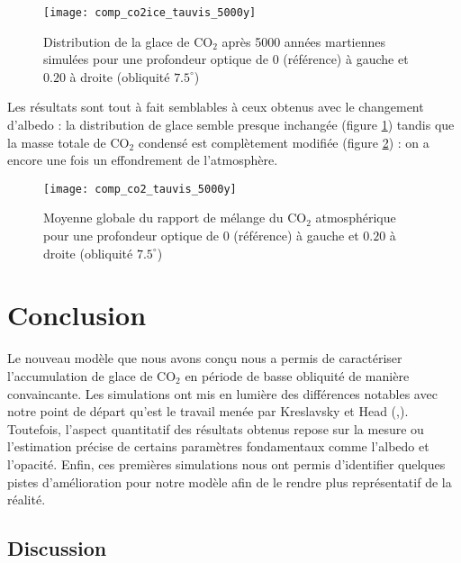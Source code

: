 \documentclass[11pt,a4paper]{article}
\begin{document}
\begin{figure}[h!]
\begin{center}
\texttt{[image: comp\_co2ice\_tauvis\_5000y]}
\caption{Distribution de la glace de CO$_2$ après 5000 années martiennes simulées pour une profondeur optique de $0$ (référence) à gauche et $0.20$ à droite (obliquité $7.5^\circ$)}
\label{comp_co2ice_tauvis_5000y}
\end{center}
\end{figure}

Les résultats sont tout à fait semblables à ceux obtenus avec le changement d'albedo : la distribution de glace semble presque inchangée (figure \ref{comp_co2ice_tauvis_5000y}) tandis que la masse totale de CO$_2$ condensé est complètement modifiée (figure \ref{comp_co2_tauvis_5000y}) : on a encore une fois un effondrement de l'atmosphère.

\begin{figure}[h!]
\begin{center}
\texttt{[image: comp\_co2\_tauvis\_5000y]}
\caption{Moyenne globale du rapport de mélange du CO$_2$ atmosphérique pour une profondeur optique de $0$ (référence) à gauche et $0.20$ à droite  (obliquité $7.5^\circ$)}
\label{comp_co2_tauvis_5000y}
\end{center}
\end{figure}



\clearpage
\section{Conclusion}
Le nouveau modèle que nous avons conçu nous a permis de caractériser l'accumulation de glace de CO$_2$ en période de basse obliquité de manière convaincante. Les simulations ont mis en lumière des différences notables avec notre point de départ qu'est le travail menée par Kreslavsky et Head (\cite{Kres:05},\cite{Kres:11}). Toutefois, l'aspect quantitatif des résultats obtenus repose sur la mesure  ou l'estimation précise de certains paramètres fondamentaux comme l'albedo et l'opacité. Enfin, ces premières simulations nous ont permis d'identifier quelques pistes d'amélioration pour notre modèle afin de le rendre plus représentatif de la réalité. \\
 
\subsection{Discussion}
\end{document}
